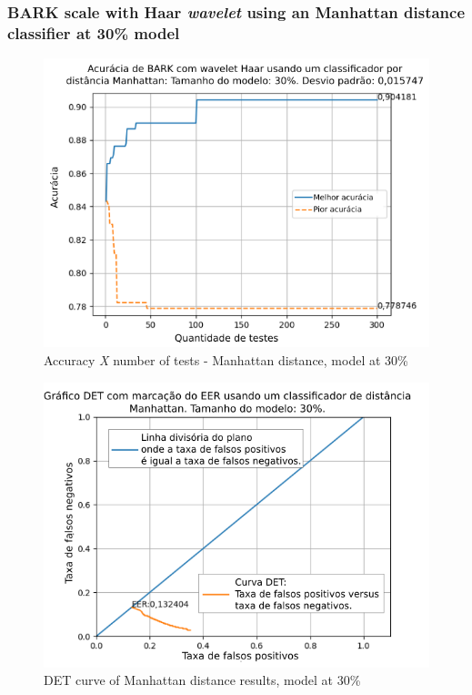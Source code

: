 		\subsubsection{BARK scale with Haar \textit{wavelet} using an Manhattan distance classifier at 30\% model}
			
			
			
			\begin{figure}[ht]
				\centering
				\includegraphics[width=\linewidth]{images/results/confusionMatrices/classifier_Manhattan_30.png}
				\caption{Accuracy \textit{X} number of tests - Manhattan distance, model at 30\%}
				\label{fig:classifiermanhattan30}
			\end{figure}
			
			\begin{figure}[!ht]
				\centering
				\includegraphics[width=\linewidth]{images/results/det/DET_for_classifier_Manhattan_30}
				\caption{DET curve of Manhattan distance results, model at 30\%}
				\label{fig:detforclassifiermanhattan30}
			\end{figure}
		
